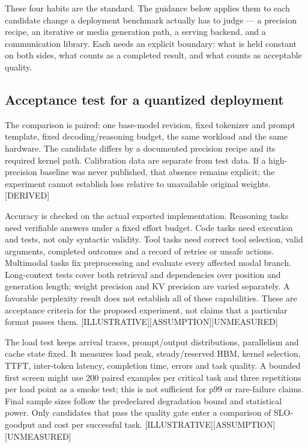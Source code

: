 These four habits are the standard. The guidance below applies them to
each candidate change a deployment benchmark actually has to judge --- a
precision recipe, an iterative or media generation path, a serving
backend, and a communication library. Each needs an explicit boundary:
what is held constant on both sides, what counts as a completed result,
and what counts as acceptable quality.

\subsection{Acceptance test for a quantized
deployment}\label{acceptance-test-for-a-quantized-deployment}

The comparison is paired: one base-model revision, fixed tokenizer and
prompt template, fixed decoding/reasoning budget, the same workload and
the same hardware. The candidate differs by a documented precision
recipe and its required kernel path. Calibration data are separate from
test data. If a high-precision baseline was never published, that
absence remains explicit; the experiment cannot establish loss relative
to unavailable original weights. \mbox{{[}DERIVED{]}}

Accuracy is checked on the actual exported implementation. Reasoning
tasks need verifiable answers under a fixed effort budget. Code tasks
need execution and tests, not only syntactic validity. Tool tasks need
correct tool selection, valid arguments, completed outcomes and a record
of retries or unsafe actions. Multimodal tasks fix preprocessing and
evaluate every affected modal branch. Long-context tests cover both
retrieval and dependencies over position and generation length; weight
precision and KV precision are varied separately. A favorable perplexity
result does not establish all of these capabilities. These are
acceptance criteria for the proposed experiment, not claims that a
particular format passes them.
\mbox{{[}ILLUSTRATIVE{]}}\hspace{0pt}\mbox{{[}ASSUMPTION{]}}\hspace{0pt}\mbox{{[}UNMEASURED{]}}

The load test keeps arrival traces, prompt/output distributions,
parallelism and cache state fixed. It measures load peak,
steady/reserved HBM, kernel selection, TTFT, inter-token latency,
completion time, errors and task quality. A bounded first screen might
use 200 paired examples per critical task and three repetitions per load
point as a smoke test; this is not sufficient for p99 or rare-failure
claims. Final sample sizes follow the predeclared degradation bound and
statistical power. Only candidates that pass the quality gate enter a
comparison of SLO-goodput and cost per successful task.
\mbox{{[}ILLUSTRATIVE{]}}\hspace{0pt}\mbox{{[}ASSUMPTION{]}}\hspace{0pt}\mbox{{[}UNMEASURED{]}}

